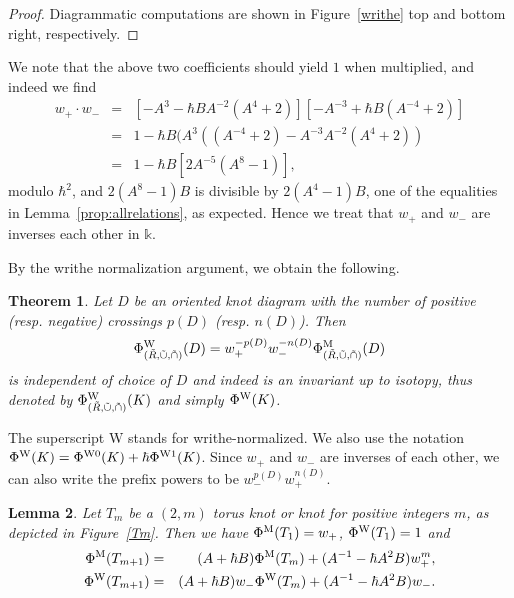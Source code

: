 \documentclass[11pt,fleqn]{amsart} %
\newtheorem{theorem}{Theorem}[section]
\newtheorem{lemma}[theorem]{Lemma}
\begin{document}
\begin{proof}
Diagrammatic computations are shown in Figure~\ref{writhe} top and bottom right, respectively.
\end{proof}

We note that the above two coefficients should yield $1$ when multiplied, and indeed we find
\begin{eqnarray*}
w_+ \cdot w_- &=& [ - A^{3} -  \hbar B A^{-2} (A^{4} + 2 ) ]    [ - A^{-3} + \hbar B (A^{-4} + 2 ) ]  \\
&=& 
1 -  \hbar B ( A^3 ( (A^{-4} + 2 )  - A^{-3} A^{-2} (A^{4} + 2 ) ) \\
&=& 
1 - \hbar B [ 2 A^{-5}  ( A^8 - 1 ) ] , 
\end{eqnarray*}
modulo $\hbar^2$, and $2   ( A^8 - 1 ) B $  is divisible by $2(A^4 -1)B$, one of the equalities in Lemma~\ref{prop:allrelations},
 as expected. Hence we treat that $w_+$ and $w_-$ are inverses each other in $\mathbb k$.

By the writhe normalization argument, we obtain the following.

\begin{theorem}\label{thm:bracket}
Let $D$ be an oriented knot diagram with the number of positive (resp. negative)  crossings $p(D)$
(resp. $n(D)$). 
Then 
$$ \Phi^{\rm W}_{(\tilde R, \tilde \cup, \tilde \cap)}  (D) = w_+^{-p(D)} w_-^{-n(D)} \Phi^{\rm M}_{(\tilde R, \tilde \cup, \tilde \cap)} (D) $$ 
is independent of choice of $D$ and indeed is an invariant up to isotopy, thus denoted by 
$ \Phi^{\rm W}_{(\tilde R, \tilde \cup, \tilde \cap)}  (K)  $ and simply  $\Phi^{\rm W} (K)$. 
\end{theorem}

The superscript W stands for writhe-normalized. 
We also use the notation $\Phi^{\rm W} (K)=\Phi^{{\rm W} 0} (K) + \hbar  \Phi^{{\rm W} 1} (K) $.
Since $w_+$ and $w_-$ are inverses of each other, we can also write the prefix powers to be $w_-^{p(D)} w_+^{n(D)}$.


\begin{lemma}\label{lem:Tm}
Let $T_m$ be a $(2,m)$ torus knot or knot  for positive integers $m$,
as depicted in Figure~\ref{Tm}. 
Then we have $ \Phi^{\rm M} (T_1)= w_+$,  $\Phi ^{\rm W}(T_1)=1$ and 
\begin{eqnarray}
 \Phi^{\rm M} (T_{m+1} ) &=&   (A + \hbar B ) \Phi^{\rm M} (T_m ) + (A^{-1} - \hbar A^2 B)  w_+^{m} , \label{eq:Tmbracket} \\
 \Phi^{\rm W} (T_{m+1}) &=&   (A + \hbar B )  w_-  \Phi^{\rm W}(T_m) +  (A^{-1} - \hbar A^2 B) w_- . \label{eq:TmJones}
\end{eqnarray}
\end{lemma}
\end{document}
